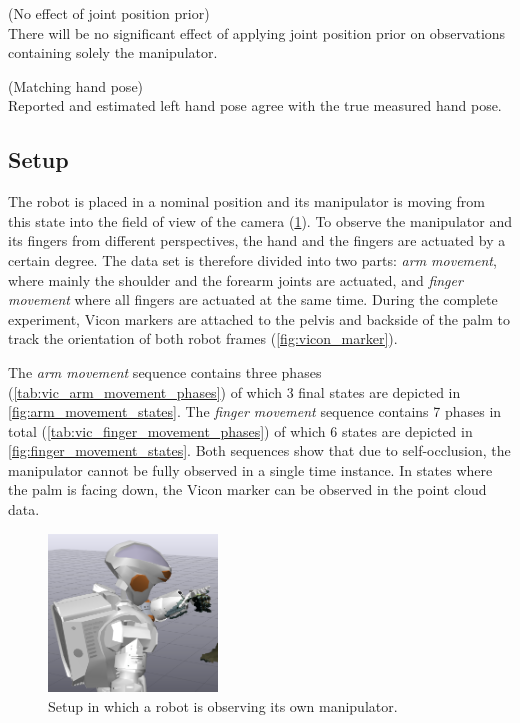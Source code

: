 \begin{hypothesis}(No effect of joint position prior)\\
There will be no significant effect of applying joint position prior on observations containing solely the manipulator.
\label{hyp:no_prior_effect}
\end{hypothesis}

\begin{hypothesis}(Matching hand pose)\\
Reported and estimated left hand pose agree with the true measured hand pose.
\label{hyp:matching_hand_pose}
\end{hypothesis}


\subsection{Setup}

The robot is placed in a nominal position and its manipulator is moving from this state into the field of view of the camera (\cref{fig:vicon_free_movement}). To observe the manipulator and its fingers from different perspectives, the hand and the fingers are actuated by a certain degree. The data set is therefore divided into two parts: \textit{arm movement}, where mainly the shoulder and the forearm joints are actuated, and \textit{finger movement} where all fingers are actuated at the same time. During the complete experiment, Vicon markers are attached to the pelvis and backside of the palm to track the orientation of both robot frames (\cref{fig:vicon_marker}).

The \textit{arm movement} sequence contains three phases (\cref{tab:vic_arm_movement_phases}) of which 3 final states are depicted in \cref{fig:arm_movement_states}. The \textit{finger movement} sequence contains 7 phases in total (\cref{tab:vic_finger_movement_phases}) of which 6 states are depicted in \cref{fig:finger_movement_states}. Both sequences show that due to self-occlusion, the manipulator cannot be fully observed in a single time instance. In states where the palm is facing down, the Vicon marker can be observed in the point cloud data.

\begin{figure}
\captionsetup{width=0.4\textwidth}
\centering
\includegraphics[width=0.4\textwidth]{images/eval_vicon/sequence/setting.png}
\caption{Setup in which a robot is observing its own manipulator.}
\label{fig:vicon_free_movement}
\end{figure}

